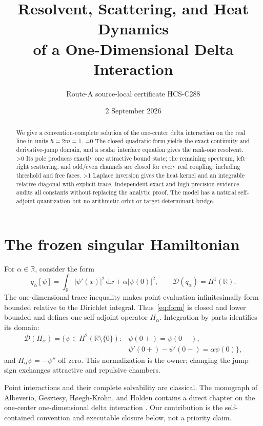 \documentclass[10pt]{article}
\title{Resolvent, Scattering, and Heat Dynamics\\
of a One-Dimensional Delta Interaction}
\author{Route-A source-local certificate HCS-C288}
\date{2 September 2026}
\providecommand{\CRevisionRound}{2}
\newcommand{\R}{\mathbb R}
\newcommand{\D}{\mathrm d}
\begin{document}
\maketitle

\begin{abstract}
We give a convention-complete solution of the one-center delta interaction
on the real line in units $\hbar=2m=1$.
\ifnum\CRevisionRound=0
The closed quadratic form yields the exact continuity and derivative-jump
domain, and a scalar interface equation gives the rank-one resolvent.
\fi
\ifnum\CRevisionRound>0
Its pole produces exactly one attractive bound state; the remaining spectrum,
left--right scattering, and odd/even channels are closed for every real
coupling, including threshold and free faces.
\fi
\ifnum\CRevisionRound>1
Laplace inversion gives the heat kernel and an integrable relative diagonal
with explicit trace.  Independent exact and high-precision evidence audits
all constants without replacing the analytic proof.  The model has a natural
self-adjoint quantization but no arithmetic-orbit or target-determinant
bridge.
\fi
\end{abstract}

\section{The frozen singular Hamiltonian}
For $\alpha\in\R$, consider the form
\begin{equation}\label{eq:form}
 q_\alpha[\psi]=\int_\R |\psi'(x)|^2\,\D x
    +\alpha|\psi(0)|^2,
 \qquad \mathcal D(q_\alpha)=H^1(\R).
\end{equation}
The one-dimensional trace inequality makes point evaluation infinitesimally
form bounded relative to the Dirichlet integral.  Thus~\eqref{eq:form} is
closed and lower bounded and defines one self-adjoint operator $H_\alpha$.
Integration by parts identifies its domain:
\begin{equation}\label{eq:domain}
 \begin{split}
 \mathcal D(H_\alpha)=\{\psi\in H^2(\R\setminus\{0\}):{}&
 \psi(0+)=\psi(0-),\\[-2pt]
 &\psi'(0+)-\psi'(0-)=\alpha\psi(0)\},
 \end{split}
\end{equation}
and $H_\alpha\psi=-\psi''$ off zero.  This normalization is the owner;
changing the jump sign exchanges attractive and repulsive chambers.

Point interactions and their complete solvability are classical.  The
monograph of Albeverio, Gesztesy, H\o egh-Krohn, and Holden contains a direct
chapter on the one-center one-dimensional delta interaction
\cite{AGHH1988}.  Our contribution is the self-contained convention and
executable closure below, not a priority claim.
\end{document}
